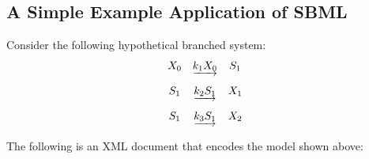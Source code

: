 \documentclass[10pt,twocolumntoc]{cekarticle}
\begin{document}
\subsection{A Simple Example Application of SBML}
\label{sec:modeleg}

Consider the following hypothetical branched system:
\begin{equation*}
  \begin{array}{@{}ccc@{}}
    X_0 & \underrightarrow{k_1 X_0} & S_1 \\ \\[-4pt]
    S_1 & \underrightarrow{k_2 S_1} & X_1 \\ \\[-4pt]
    S_1 & \underrightarrow{k_3 S_1} & X_2
  \end{array}
\end{equation*}

The following is an XML document that encodes the model shown
above:
\end{document}
